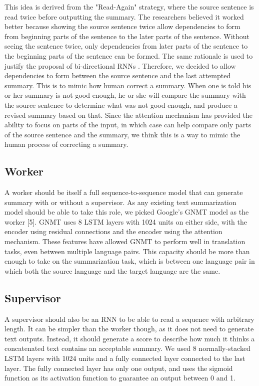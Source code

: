 \documentclass[letterpaper]{article} %
\begin{document}
This idea is derived from the "Read-Again" strategy, where the source sentence is read twice before outputting the summary. The researchers believed it worked better because showing the source sentence twice allow dependencies to form from beginning parts of the sentence to the later parts of the sentence. Without seeing the sentence twice, only dependencies from later parts of the sentence to the beginning parts of the sentence can be formed. The same rationale is used to justify the proposal of bi-directional RNNs \cite{schuster1997bidirectional}. Therefore, we decided to allow dependencies to form between the source sentence and the last attempted summary. This is to mimic how human correct a summary. When one is told his or her summary is not good enough, he or she will compare the summary with the source sentence to determine what was not good enough, and produce a revised summary based on that. Since the attention mechanism has provided the ability to focus on parts of the input, in which case can help compare only parts of the source sentence and the summary, we think this is a way to mimic the human process of correcting a summary.

\subsection{Worker}
A worker should be itself a full sequence-to-sequence model that can generate summary with or without a supervisor. As any existing text summarization model should be able to take this role, we picked Google’s GNMT model as the worker [5]. GNMT uses 8 LSTM layers with 1024 units on either side, with the encoder using residual connections and the encoder using the attention mechanism. These features have allowed GNMT to perform well in translation tasks, even between multiple language pairs. This capacity should be more than enough to take on the summarization task, which is between one language pair in which both the source language and the target language are the same.

\subsection{Supervisor}
A supervisor should also be an RNN to be able to read a sequence with arbitrary length. It can be simpler than the worker though, as it does not need to generate text outputs. Instead, it should generate a score to describe how much it thinks a concatenated text contains an acceptable summary. We used 8 normally-stacked LSTM layers with 1024 units and a fully connected layer connected to the last layer. The fully connected layer has only one output, and uses the sigmoid function as its activation function to guarantee an output between 0 and 1.
\end{document}
